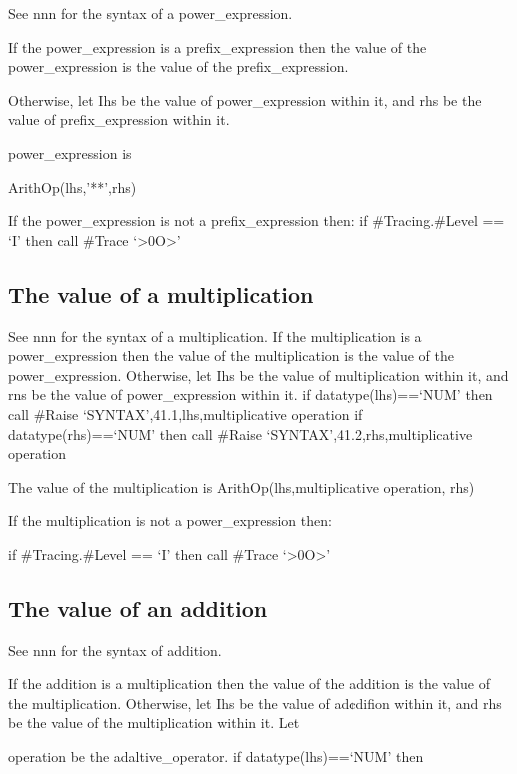 See nnn for the syntax of a power\_expression.

If the power\_expression is a prefix\_expression then the value of the
power\_expression is the value of the prefix\_expression.

Otherwise, let Ihs be the value of power\_expression within it, and rhs
be the value of prefix\_expression within it.


power\_expression is

ArithOp(lhs,'**',rhs)

If the power\_expression is not a prefix\_expression then: if
\#Tracing.\#Level == `I' then call \#Trace
`\textgreater0O\textgreater{}'

\subsection{The value of a
multiplication}\label{the-value-of-a-multiplication}

See nnn for the syntax of a multiplication. If the multiplication is a
power\_expression then the value of the multiplication is the value of
the power\_expression. Otherwise, let Ihs be the value of multiplication
within it, and rns be the value of power\_expression within it. if
datatype(lhs)==`NUM' then call \#Raise `SYNTAX',41.1,lhs,multiplicative
operation if datatype(rhs)==`NUM' then call \#Raise
`SYNTAX',41.2,rhs,multiplicative operation

The value of the multiplication is ArithOp(lhs,multiplicative operation,
rhs)

If the multiplication is not a power\_expression then:

if \#Tracing.\#Level == `I' then call \#Trace
`\textgreater0O\textgreater{}'

\subsection{The value of an addition}\label{the-value-of-an-addition}

See nnn for the syntax of addition.

If the addition is a multiplication then the value of the addition is
the value of the multiplication. Otherwise, let Ihs be the value of
ad¢difion within it, and rhs be the value of the multiplication within
it. Let

operation be the adaltive\_operator. if datatype(lhs)==`NUM' then

